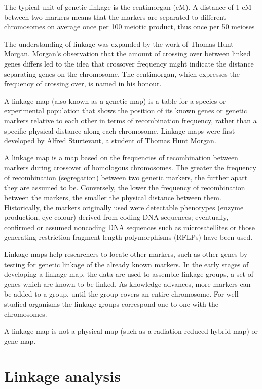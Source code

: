 The typical unit of genetic linkage is the centimorgan (cM). A distance of 1 cM between two markers means that the markers are separated to different chromosomes on average once per 100 meiotic product, thus once per 50 meioses

The understanding of linkage was expanded by the work of Thomas Hunt Morgan. Morgan's observation that the amount of crossing over between linked genes differs led to the idea that crossover frequency might indicate the distance separating genes on the chromosome. The centimorgan, which expresses the frequency of crossing over, is named in his honour.

A linkage map (also known as a genetic map) is a table for a species or experimental population that shows the position of its known genes or genetic markers relative to each other in terms of recombination frequency, rather than a specific physical distance along each chromosome. Linkage maps were first developed by \href{https://en.wikipedia.org/wiki/Alfred_Sturtevant}{Alfred Sturtevant}, a student of Thomas Hunt Morgan.

A linkage map is a map based on the frequencies of recombination between markers during crossover of homologous chromosomes. The greater the frequency of recombination (segregation) between two genetic markers, the further apart they are assumed to be. Conversely, the lower the frequency of recombination between the markers, the smaller the physical distance between them. Historically, the markers originally used were detectable phenotypes (enzyme production, eye colour) derived from coding DNA sequences; eventually, confirmed or assumed noncoding DNA sequences such as microsatellites or those generating restriction fragment length polymorphisms (RFLPs) have been used.

Linkage maps help researchers to locate other markers, such as other genes by testing for genetic linkage of the already known markers. In the early stages of developing a linkage map, the data are used to assemble linkage groups, a set of genes which are known to be linked. As knowledge advances, more markers can be added to a group, until the group covers an entire chromosome. For well-studied organisms the linkage groups correspond one-to-one with the chromosomes.

A linkage map is not a physical map (such as a radiation reduced hybrid map) or gene map.

\hypertarget{linkage-analysis}{%
\section{Linkage analysis}\label{linkage-analysis}}

